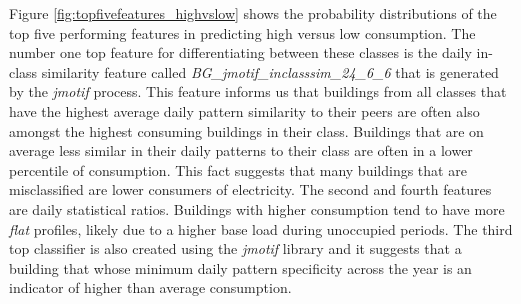 Figure \ref{fig:topfivefeatures_highvslow} shows the probability distributions of the top five performing features in predicting high versus low consumption. The number one top feature for differentiating between these classes is the daily in-class similarity feature called \emph{BG_jmotif_inclasssim_24_6_6} that is generated by the \emph{jmotif} process. This feature informs us that buildings from all classes that have the highest average daily pattern similarity to their peers are often also amongst the highest consuming buildings in their class. Buildings that are on average less similar in their daily patterns to their class are often in a lower percentile of consumption. This fact suggests that many buildings that are misclassified are lower consumers of electricity. The second and fourth features are daily statistical ratios. Buildings with higher consumption tend to have more \emph{flat} profiles, likely due to a higher base load during unoccupied periods. The third top classifier is also created using the \emph{jmotif} library and it suggests that a building that whose minimum daily pattern specificity across the year is an indicator of higher than average consumption. 